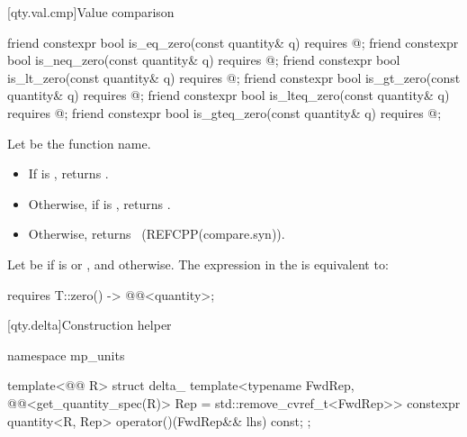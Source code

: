 [qty.val.cmp]{Value comparison}

\begin{itemdecl}
friend constexpr bool is_eq_zero(const quantity& q) requires @\seebelownc@;
friend constexpr bool is_neq_zero(const quantity& q) requires @\seebelownc@;
friend constexpr bool is_lt_zero(const quantity& q) requires @\seebelownc@;
friend constexpr bool is_gt_zero(const quantity& q) requires @\seebelownc@;
friend constexpr bool is_lteq_zero(const quantity& q) requires @\seebelownc@;
friend constexpr bool is_gteq_zero(const quantity& q) requires @\seebelownc@;
\end{itemdecl}

\begin{itemdescr}
\pnum
Let  be the function name.

\pnum
\returns
\begin{itemize}
\item
If  is , returns .
\item
Otherwise, if  is , returns .
\item
Otherwise, returns ~(REFCPP(compare.syn)).
\end{itemize}

\pnum
\remarks
Let  be
 if  is  or , and
 otherwise.
The expression in the  is equivalent to:
\begin{codeblock}
requires {
  { T::zero() } -> @@<quantity>;
}
\end{codeblock}
\end{itemdescr}

[qty.delta]{Construction helper }

\begin{codeblock}
namespace mp_units {

template<@@ R>
struct delta_ {
  template<typename FwdRep,
           @@<get_quantity_spec(R{})> Rep = std::remove_cvref_t<FwdRep>>
  constexpr quantity<R{}, Rep> operator()(FwdRep&& lhs) const;
};

}
\end{codeblock}

